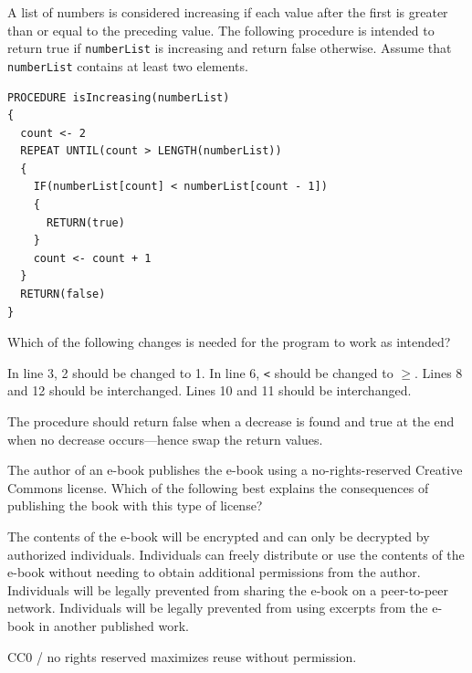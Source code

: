 \question[5]
A list of numbers is considered increasing if each value after the first is greater than or equal to the preceding value. The following procedure is intended to return true if \texttt{numberList} is increasing and return false otherwise. Assume that \texttt{numberList} contains at least two elements.
\begin{lstlisting}[style=pseudo]
PROCEDURE isIncreasing(numberList)
{
  count <- 2
  REPEAT UNTIL(count > LENGTH(numberList))
  {
    IF(numberList[count] < numberList[count - 1])
    {
      RETURN(true)
    }
    count <- count + 1
  }
  RETURN(false)
}
\end{lstlisting}
Which of the following changes is needed for the program to work as intended?
\begin{choices}
  \choice In line 3, 2 should be changed to 1.
  \choice In line 6, \texttt{<} should be changed to \(\ge\).
  \CorrectChoice Lines 8 and 12 should be interchanged.
  \choice Lines 10 and 11 should be interchanged.
\end{choices}
\begin{solution}
  The procedure should return false when a decrease is found and true at the end when no decrease occurs---hence swap the return values.
\end{solution}



\newpage





\question[5]
The author of an e-book publishes the e-book using a no-rights-reserved Creative Commons license. Which of the following best explains the consequences of publishing the book with this type of license?
\begin{choices}
  \choice The contents of the e-book will be encrypted and can only be decrypted by authorized individuals.
  \CorrectChoice Individuals can freely distribute or use the contents of the e-book without needing to obtain additional permissions from the author.
  \choice Individuals will be legally prevented from sharing the e-book on a peer-to-peer network.
  \choice Individuals will be legally prevented from using excerpts from the e-book in another published work.
\end{choices}
\begin{solution}
  CC0 / no rights reserved maximizes reuse without permission.
\end{solution}

